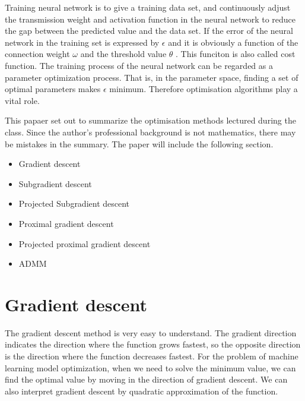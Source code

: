 \documentclass[aps,letterpaper,10pt]{article}
\begin{document}
Training neural network is to give a training data set, and continuously adjust the transmission weight and activation function in the neural network to reduce the gap between the predicted value and the data set. If the error of the neural network in the training set is expressed by $\epsilon$ and it is obviously a function of the connection weight $\omega$ and the threshold value $\theta$ . This funciton is also called cost function. The training process of the neural network can be regarded as a parameter optimization process. That is, in the parameter space, finding a set of optimal parameters makes $\epsilon$ minimum. Therefore optimisation algorithms play a vital role.\vspace{3mm}

This papaer set out to summarize the optimisation methods lectured during the class. Since the author's professional background is not mathematics, there may be mistakes in the summary. The paper will include the following section.


\vspace{3mm}


\begin{itemize}
	\item Gradient descent
  \item Subgradient descent
  \item Projected Subgradient descent
	\item Proximal gradient descent
  \item Projected proximal gradient descent
	\item ADMM
\end{itemize}
\vspace{3mm}



\newpage
\section{Gradient descent}
The gradient descent method is very easy to understand. The gradient direction indicates the direction where the function grows fastest, so the opposite direction is the direction where the function decreases fastest. For the problem of machine learning model optimization, when we need to solve the minimum value, we can find the optimal value by moving in the direction of gradient descent. We can also interpret gradient descent by quadratic approximation of the function.\vspace{3mm}
\end{document}
